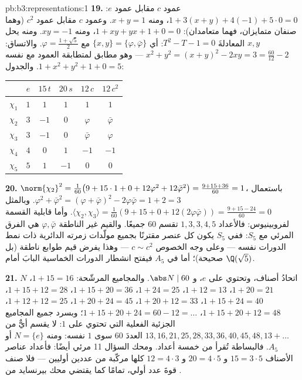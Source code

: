 \begin{solution}{pb:b3:representations:1}
\textbf{19.} عمود $c$ مقابل عمود $e$: $1 + 3(x + y) +
4(-1) + 5\cdot0 = 0$، ومنه $x + y = 1$.
وعمود $c$ مقابل عمود $c^2$ (وهما صنفان متمايزان، فهما
متعامدان): $1 + xy + yx + 1
+ 0 = 0$، ومنه $xy = -1$. ومنه يحل $x, y$ المعادلةَ
$T^2 - T - 1 = 0$: أي $\{x, y\} = \{\varphi, \bar\varphi\}$ مع $\varphi = \frac{1 +
\sqrt5}2$. والاتساق: $x^2 + y^2 = (x+y)^2 - 2xy = 3 =
\frac{60}{12} - 2$ --- وهو
مطابق لمتطابقة العمود مع نفسه $1 +
x^2 + y^2 + 1 + 0 = 5$. والجدول:
\begin{center}
\begin{tabular}{c|ccccc}
 & $e$ & $15\,t$ & $20\,s$ & $12\,c$ & $12\,c^2$\\
\hline
$\chi_1$ & $1$ & $1$ & $1$ & $1$ & $1$\\
$\chi_2$ & $3$ & $-1$ & $0$ & $\varphi$ & $\bar\varphi$\\
$\chi_3$ & $3$ & $-1$ & $0$ & $\bar\varphi$ & $\varphi$\\
$\chi_4$ & $4$ & $0$ & $1$ & $-1$ & $-1$\\
$\chi_5$ & $5$ & $1$ & $-1$ & $0$ & $0$\\
\end{tabular}
\end{center}

\textbf{20.} $\norm{\chi_2}^2 = \frac1{60}\bigl(9 + 15\cdot1 +
0 + 12\varphi^2 + 12\bar\varphi^2\bigr) = \frac{9 + 15 +
36}{60} = 1$، باستعمال $\varphi^2 + \bar\varphi^2 = (\varphi +
\bar\varphi)^2 - 2\varphi\bar\varphi = 1 + 2 = 3$. وبالمثل $\langle\chi_2, \chi_3\rangle = \frac1{60}(9 + 15 + 0 +
12(2\varphi\bar\varphi)) = \frac{9 + 15 - 24}{60} = 0$. وأما
قابلية القسمة لفروبينيوس: فالأعداد $1, 3, 3, 4, 5$ تقسم $60$
جميعًا. والقيم غير الناطقة $\varphi, \bar\varphi$ هي الفرق المرئي مع $S_5$:
ففي $S_5$ يكون كل عنصر مقترنًا بجميع مولّدات زمرته الدائرية ذات
نمط الدورات نفسه --- وعلى وجه الخصوص $c \sim c^2$ --- وهذا
يفرض قيم طوابع ناطقة (بل صحيحة)؛ أما في $A_5$ فيفتح انشطار
الدورات الخماسية البابَ أمام $\Q(\sqrt5)$.

\textbf{21.}  $N$ اتحادُ أصناف، وتحتوي
على $e$، و $\abs N \mid 60$. والمجاميع المرشّحة:
$1{+}15 = 16$، $1{+}20 = 21$، $1{+}12 = 13$، $1{+}24 = 25$،
$1{+}15{+}20 = 36$، $1{+}15{+}12 = 28$، $1{+}15{+}24 = 40$، $1{+}20{+}12 = 33$، $1{+}20{+}24 = 45$، $1{+}12{+}12 = 25$، $1{+}15{+}20{+}12 = 48$،
$1{+}15{+}20{+}24 = 60 - 12 = \dots$؛ وبسرد جميع المجاميع الجزئية الفعلية التي تحتوي على
$1$: لا يقسم أيٌّ من $13, 16,
21, 25, 28, 33, 36, 40, 45, 48, 13{+}\dots$ العددَ $60$ سوى $1$ نفسه: ومنه
$N = \{e\}$ أو $A_5$. فالبساطة تُقرأ من خمسة أعداد. ومحك
السؤال 11 مرئي أيضًا: فأعداد عناصر الأصناف $15 = 3\cdot5$
و $20 = 4\cdot5$ و $12 = 4\cdot3$ كلها مركّبة من عددين أوليين
--- فلا صنف قوةَ عدد أولي، تمامًا كما يقتضي محك بيرنسايد من
.


\end{solution}
